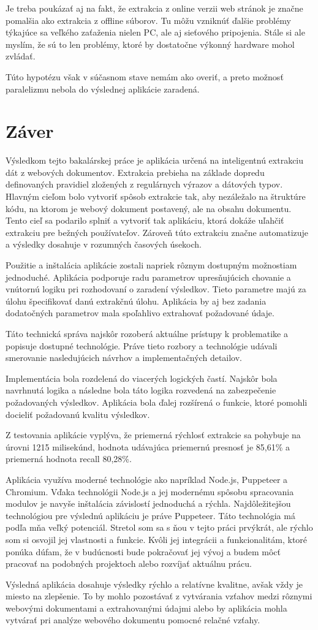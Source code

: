 Je treba poukázať aj na fakt, že extrakcia z online verzii web stránok je značne pomalšia ako extrakcia z offline súborov. Tu môžu vzniknúť ďalšie problémy týkajúce sa veľkého zaťaženia nielen PC, ale aj sieťového pripojenia. Stále si ale myslím, že sú to len problémy, ktoré by dostatočne výkonný hardware mohol zvládať.

Túto hypotézu však v súčasnom stave nemám ako overiť, a preto možnosť paralelizmu nebola do výslednej aplikácie zaradená.


\chapter{Záver}

Výsledkom tejto bakalárskej práce je aplikácia určená na inteligentnú extrakciu dát z webových dokumentov. Extrakcia prebieha na základe dopredu definovaných pravidiel zložených z regulárnych výrazov a dátových typov. Hlavným cieľom bolo vytvoriť spôsob extrakcie tak, aby nezáležalo na štruktúre kódu, na ktorom je webový dokument postavený, ale na obsahu dokumentu. Tento cieľ sa podarilo splniť a vytvoriť tak aplikáciu, ktorá dokáže uľahčiť extrakciu pre bežných používateľov. Zároveň túto extrakciu značne automatizuje a výsledky dosahuje v rozumných časových úsekoch.

Použitie a inštalácia aplikácie zostali napriek rôznym dostupným možnostiam jednoduché. Aplikácia podporuje radu parametrov upresňujúcich chovanie a vnútornú logiku pri rozhodovaní o zaradení výsledkov. Tieto parametre majú za úlohu špecifikovať danú extrakčnú úlohu. Aplikácia by aj bez zadania dodatočných parametrov mala spoľahlivo extrahovať požadované údaje.

Táto technická správa najskôr rozoberá aktuálne prístupy k problematike a popisuje dostupné technológie. Práve tieto rozbory a technológie udávali smerovanie nasledujúcich návrhov a implementačných detailov. 

Implementácia bola rozdelená do viacerých logických častí. Najskôr bola navrhnutá logika a následne bola táto logika rozvedená na zabezpečenie požadovaných výsledkov. Aplikácia bola ďalej rozšírená o funkcie, ktoré pomohli docieliť požadovanú kvalitu výsledkov.

Z testovania aplikácie vyplýva, že priemerná rýchlosť extrakcie sa pohybuje na úrovni 1215 milisekúnd, hodnota udávajúca priemernú presnosť je 85,61\% a priemerná hodnota recall 80,28\%. 

Aplikácia využíva moderné technológie ako napríklad Node.js, Puppeteer a Chromium. Vďaka technológii Node.js a jej modernému spôsobu spracovania modulov je navyše inštalácia závislostí jednoduchá a rýchla. Najdôležitejšou technológiou pre výslednú aplikáciu je práve Puppeteer. Táto technológia má podľa mňa veľký potenciál. Stretol som sa s ňou v tejto práci prvýkrát, ale rýchlo som si osvojil jej vlastnosti a funkcie. Kvôli jej integrácii a funkcionalitám, ktoré ponúka dúfam, že v budúcnosti bude pokračovať jej vývoj a budem môcť pracovať na podobných projektoch alebo rozvíjať aktuálnu prácu.

Výsledná aplikácia dosahuje výsledky rýchlo a relatívne kvalitne, avšak vždy je miesto na zlepšenie. To by mohlo pozostávať z vytvárania vzťahov medzi rôznymi webovými dokumentami a extrahovanými údajmi alebo by aplikácia mohla vytvárať pri analýze webového dokumentu pomocné relačné vzťahy.
